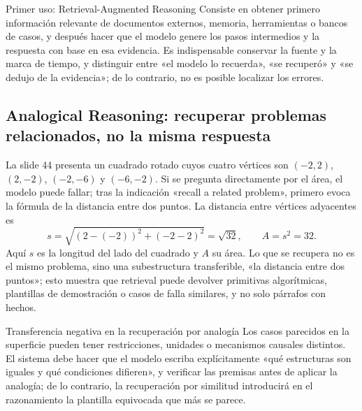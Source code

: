 \begin{knowledgebox}{Primer uso: Retrieval-Augmented Reasoning}
Consiste en obtener primero información relevante de documentos externos, memoria, herramientas o bancos de casos, y después hacer que el modelo genere los pasos intermedios y la respuesta con base en esa evidencia. Es indispensable conservar la fuente y la marca de tiempo, y distinguir entre «el modelo lo recuerda», «se recuperó» y «se dedujo de la evidencia»; de lo contrario, no es posible localizar los errores.
\end{knowledgebox}

\subsection{Analogical Reasoning: recuperar problemas relacionados, no la misma respuesta}

La slide 44 presenta un cuadrado rotado cuyos cuatro vértices son $(-2,2)$, $(2,-2)$, $(-2,-6)$ y $(-6,-2)$. Si se pregunta directamente por el área, el modelo puede fallar; tras la indicación «recall a related problem», primero evoca la fórmula de la distancia entre dos puntos. La distancia entre vértices adyacentes es
\[
s=\sqrt{(2-(-2))^2+(-2-2)^2}=\sqrt{32},
\qquad A=s^2=32.
\]
Aquí $s$ es la longitud del lado del cuadrado y $A$ su área. Lo que se recupera no es el mismo problema, sino una subestructura transferible, «la distancia entre dos puntos»; esto muestra que retrieval puede devolver primitivas algorítmicas, plantillas de demostración o casos de falla similares, y no solo párrafos con hechos.



\begin{warningbox}{Transferencia negativa en la recuperación por analogía}
Los casos parecidos en la superficie pueden tener restricciones, unidades o mecanismos causales distintos. El sistema debe hacer que el modelo escriba explícitamente «qué estructuras son iguales y qué condiciones difieren», y verificar las premisas antes de aplicar la analogía; de lo contrario, la recuperación por similitud introducirá en el razonamiento la plantilla equivocada que más se parece.
\end{warningbox}


